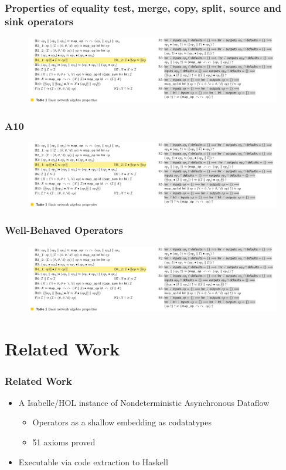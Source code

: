 \documentclass[fleqn,aspectratio=169,10pt]{beamer}
\begin{document}
\begin{frame}[fragile]
  \frametitle{Properties of equality test, merge, copy, split, source and sink operators}
  \begin{figure}
    \centering
    \includegraphics[width=1\textwidth]{table_1_3.png}
  \end{figure}
\end{frame}

\begin{frame}[fragile]
  \frametitle{A10}
  \begin{figure}
    \centering
    \includegraphics[width=1\textwidth]{table_1_3.png}
  \end{figure}
\end{frame}

\begin{frame}[fragile]
  \frametitle{Well-Behaved Operators}
  \begin{figure}
    \centering
    \includegraphics[width=1\textwidth]{table_1_3.png}
  \end{figure}
\end{frame}

\section{Related Work}

\begin{frame}[fragile]
  \frametitle{Related Work}
  \begin{itemize}
    \item A Isabelle/HOL instance of Nondeterministic Asynchronous Dataflow
          \begin{itemize}
            \item Operators as a shallow embedding as codatatypes
            \item 51 axioms proved
          \end{itemize}
    \item Executable via code extraction to Haskell
  \end{itemize}
\end{frame}
\end{document}
